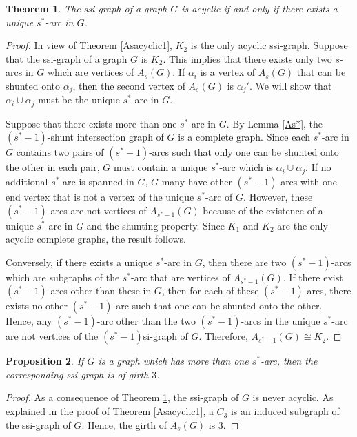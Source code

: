 \documentclass[12pt,a4paper,twoside]{article}
\newtheorem{theorem}{Theorem}[section]
\newtheorem{proposition}[theorem]{Proposition}
\theoremstyle{casesty}
\theoremstyle{subcasesty}
\theoremstyle{schemesty}
\begin{document}
\begin{theorem} \label{Asacyclic2}
	The ssi-graph of a graph $G$ is acyclic if and only if there exists a unique $s^{\ast}$-arc in $G$. 
\end{theorem}
\begin{proof}	
	In view of Theorem \ref{Asacyclic1}, $K_{2}$ is the only acyclic ssi-graph. Suppose that the ssi-graph of a graph $G$ is $K_{2}$. This implies that there exists only two $s$-arcs in $G$ which are vertices of $A_{s}(G)$. If $\alpha_{i}$ is a vertex of $A_{s}(G)$ that can be shunted onto $\alpha_{j}$, then the second vertex of $A_{s}(G)$ is $\alpha_{j}'$. %
	We will show that $\alpha_{i} \cup \alpha_{j}$ must be the unique $s^{\ast}$-arc in $G$. 
	
	Suppose that there exists more than one $s^{\ast}$-arc in $G$. By Lemma \ref{As*}, the $(s^{\ast}-1)$-shunt intersection graph of $G$ is a complete graph. 
	Since each $s^{\ast}$-arc in $G$ contains two pairs of $(s^{\ast}-1)$-arcs such that only one can be shunted onto the other in each pair, $G$ must contain a unique $s^{\ast}$-arc which is $\alpha_{i} \cup \alpha_{j}$. If no additional $s^{\ast}$-arc is spanned in $G$, $G$ many have other $(s^{\ast}-1)$-arcs with one end vertex that is not a vertex of the unique $s^{\ast}$-arc of $G$. However, these $(s^{\ast}-1)$-arcs are not vertices of $A_{s^{\ast}-1}(G)$ because of the existence of a unique $s^{\ast}$-arc in $G$ and the shunting property. Since $K_{1}$ and $K_{2}$ are the only acyclic complete graphs, the result follows.
	
	Conversely, if there exists a unique $s^{\ast}$-arc in $G$, then there are two $(s^{\ast}-1)$-arcs which are subgraphs of the $s^{\ast}$-arc that are vertices of $A_{s^{\ast}-1}(G)$. If there exist $(s^{\ast}-1)$-arcs other than these in $G$, then for each of these $(s^{\ast}-1)$-arcs, there exists no other $(s^{\ast}-1)$-arc such that one can be shunted onto the other. Hence, any $(s^{\ast}-1)$-arc other than the two $(s^{\ast}-1)$-arcs in the unique $s^{\ast}$-arc are not vertices of the $(s^{\ast}-1)$si-graph of $G$. Therefore, $A_{s^{\ast}-1}(G) \cong K_{2}$. 
\end{proof}

\begin{proposition} \label{Asgirth}
	If $G$ is a graph which has more than one $s^{\ast}$-arc, then the corresponding ssi-graph is of girth $3$.
\end{proposition}
\begin{proof}
	As a consequence of Theorem \ref{Asacyclic2}, the ssi-graph of $G$ is never acyclic. As explained in the proof of Theorem \ref{Asacyclic1}, a $C_{3}$ is an induced subgraph of the ssi-graph of $G$. Hence, the girth of $A_{s}(G)$ is $3$.
\end{proof}
\end{document}
